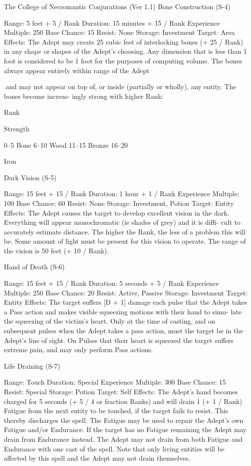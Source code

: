 \begin{Chapter}{The College of Necromantic Conjurations (Ver 1.1)}
Bone Construction (S-4) 

Range: 5 feet + 5 / Rank 
Duration: 15 minutes + 15 / Rank 
Experience Multiple: 250 
Base Chance: 15%
Resist: None 
Storage: Investment 
Target: Area 
Effects:  The  Adept  may  create  25  cubic  feet  of 
interlocking  bones  (+  25  /  Rank)  in  any  shape  or 
shapes  of  the  Adept’s  choosing.  Any  dimension 
that is less than 1 foot is considered to be 1 foot for 
the  purposes  of  computing  volume.  The  bones 
always  appear  entirely  within  range  of  the  Adept 

and  may  not  appear  on  top  of,  or  inside  (partially 
or  wholly), any entity. The bones become increas-
ingly strong with higher Rank: 

Rank 

Strength 

0–5 
Bone 
6–10  Wood 
11–15  Bronze 
16–20 

Iron 

Dark Vision (S-5) 

Range: 15 feet + 15 / Rank 
Duration: 1 hour + 1 / Rank 
Experience Multiple: 100 
Base Chance: 60%
Resist: None 
Storage: Investment, Potion 
Target: Entity 
Effects:  The  Adept  causes  the  target  to  develop 
excellent vision in the dark. Everything will appear 
monochromatic  (ie  shades  of  grey)  and  it  is  diffi-
cult to accurately estimate distance. The higher the 
Rank,  the  less  of  a  problem  this  will  be.  Some 
amount  of  light  must  be  present  for  this  vision  to 
operate.  The  range  of  the  vision  is  50  feet  (+  10  / 
Rank). 

Hand of Death (S-6) 

Range: 15 feet + 15 / Rank 
Duration: 5 seconds + 5 / Rank 
Experience Multiple: 250 
Base Chance: 20%
Resist: Active, Passive 
Storage: Investment 
Target: Entity 
Effects:  The  target  suffers  [D  +  1]  damage  each 
pulse that the Adept takes a Pass action and makes 
visible squeezing motions with their hand to simu-
late the squeezing of the victim’s heart. Only at the 
time of casting, and on subsequent pulses when the 
Adept takes a pass action, must the target be in the 
Adept’s  line  of  sight.  On  Pulses  that  their  heart  is 
squeezed  the  target  suffers  extreme  pain,  and may 
only perform Pass actions. 

Life Draining (S-7) 

Range: Touch 
Duration: Special 
Experience Multiple: 300 
Base Chance: 15%
Resist: Special 
Storage: Potion 
Target: Self 
Effects:  The  Adept’s  hand  becomes  charged  for  5 
seconds (+ 5 / 4 or fraction Ranks) and will drain 1 
(+  1  /  Rank)  Fatigue  from  the  next  entity  to  be 
touched,  if  the  target  fails  to  resist.  This  thereby 
discharges  the  spell.  The  Fatigue  may  be  used  to 
repair  the  Adept’s  own  Fatigue  and/or  Endurance. 
If  the  target  has  no  Fatigue  remaining  the  Adept 
may drain from Endurance instead. The Adept may 
not  drain  from  both  Fatigue  and  Endurance  with 
one cast of the spell. Note that only  living entities 
will be affected by this spell and the Adept may not 
drain themselves. 


\end{Chapter}
